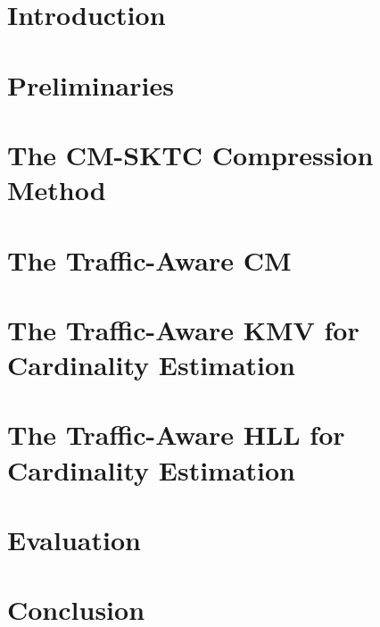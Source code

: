 
\section{Introduction}\label{sktc-sec:intro}


\section{Preliminaries} \label{sktc-sec:background}


\section{The CM-SKTC Compression Method}\label{sktc-sec:com-sketch}


\section{The Traffic-Aware CM}\label{sktc-sec:resize}


\section{The Traffic-Aware KMV for Cardinality Estimation}\label{sktc-sec:kmv-sktc}


\section{The Traffic-Aware HLL for Cardinality Estimation}\label{sktc-sec:hll}


\section{Evaluation}\label{sktc-sec:evaluation}


\section{Conclusion}\label{sktc-sec:conclusion}


